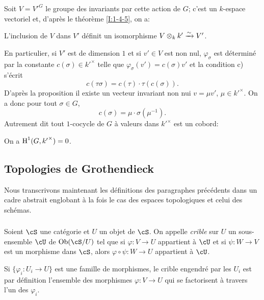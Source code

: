 Soit $V={V'}^G$ le groupe des invariants par cette action de $G$; c'est un 
$k$-espace vectoriel et, d'après le théorème \ref{I:1-4-5}, on a:

\begin{proposition}\label{I:1-5-2}
L'inclusion de $V$ dans $V'$ définit un isomorphisme 
$V\otimes_k k' \xrightarrow\sim V'$.
\end{proposition}

En particulier, si $V'$ est de dimension $1$ et si $v'\in V$ est non nul, 
$\varphi_\sigma$ est déterminé par la constante 
$c(\sigma)\in {k'}^\times$ telle que $\varphi_\sigma(v')=c(\sigma)v'$ et la 
condition c) s'écrit 
\[
  c(\tau\sigma) = c(\tau)\cdot \tau(c(\sigma))\text{.}
\]
D'après la proposition il existe un vecteur invariant non nui 
$v=\mu v'$, $\mu\in {k'}^\times$. On a donc pour tout $\sigma\in G$, 
\[
  c(\sigma) = \mu\cdot \sigma(\mu^{-1})\text{.}
\]
Autrement dit tout $1$-cocycle de $G$ à valeurs dans ${k'}^\times$ est un 
cobord: 

\begin{corollary}\label{I:1-5-3}
On a $\operatorname{H}^1(G,{k'}^\times)=0$.
\end{corollary}










\subsection{Topologies de Grothendieck}\label{I:1-6}

Nous transcrivons maintenant les définitions des paragraphes précédents 
dans un cadre abstrait englobant à la fois le cas des espaces topologiques 
et celui des schémas. 





\subsubsection{}\label{I:1-6-1}

Soient $\cS$ une catégorie et $U$ un objet de $\cS$. On appelle \emph{crible} 
sur $U$ un sous-ensemble $\cU$ de $\ob(\cS/U)$ tel que si $\varphi:V\to U$ 
appartient à $\cU$ et si $\psi:W\to V$ est un morphisme dans $\cS$, alors 
$\varphi\circ\psi:W\to U$ appartient à $\cU$. 

Si $\{\varphi_i:U_i\to U\}$ est une famille de morphismes, le crible 
engendré par les $U_i$ est par définition l'ensemble des morphismes 
$\varphi:V\to U$ qui se factorisent à travers l'un des $\varphi_i$. 

